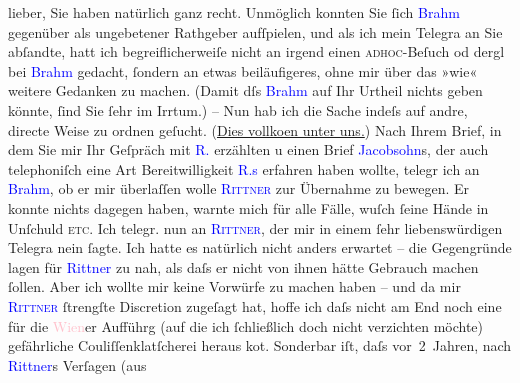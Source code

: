 \pstart
           lieber, Sie haben natürlich ganz recht. Unmöglich konnten Sie ſich
                  \textcolor{blue}{Brahm}{}\ledrightnote{\textcolor{blue}{Otto Brahm}} gegenüber als ungebetener Rathgeber
               aufſpielen, und als ich mein Telegra{\geminationm} an Sie abſandte,
               hatt ich begreiflicherweiſe nicht an irgend einen \textsc{adhoc}-Beſuch od dergl bei \textcolor{blue}{Brahm}{}\ledrightnote{\textcolor{blue}{Otto Brahm}} gedacht,
               ſondern an etwas beiläufigeres, ohne mir über das »wie« weitere Gedanken zu machen.
               (Damit dſs \textcolor{blue}{Brahm}{}\ledrightnote{\textcolor{blue}{Otto Brahm}} auf Ihr Urtheil nichts geben
               könnte, ſind Sie ſehr im Irrtum.) – Nun hab ich die Sache indeſs auf andre, directe
               Weise zu ordnen geſucht. {\pb}(\uline{Dies vollko{\geminationm}en unter
               uns.}) Nach Ihrem Brief, in dem Sie mir Ihr Geſpräch mit \textcolor{blue}{R.}{}\ledrightnote{\textcolor{blue}{Rudolf Rittner}} erzählten u einen Brief \textcolor{blue}{Jacobsohn}{}\ledrightnote{\textcolor{blue}{Siegfried Jacobsohn}}s, der auch telephoniſch eine Art Bereitwilligkeit \textcolor{blue}{R.s}{}\ledrightnote{\textcolor{blue}{Rudolf Rittner}} erfahren haben wollte, telegr ich an \textcolor{blue}{Brahm}{}\ledrightnote{\textcolor{blue}{Otto Brahm}}, ob er mir überlaſſen wolle \textcolor{blue}{\textsc{Rittner}}{}\ledrightnote{\textcolor{blue}{Rudolf Rittner}} zur Übernahme
               zu bewegen. Er konnte nichts dagegen haben, warnte mich für alle Fälle, wuſch ſeine
               Hände in Unſchuld \textsc{etc.} Ich telegr. nun an \textcolor{blue}{\textsc{Rittner}}{}\ledrightnote{\textcolor{blue}{Rudolf Rittner}}, der mir in einem ſehr
               liebenswürdigen Telegra{\geminationm} nein ſagte. Ich hatte es
               natürlich nicht anders erwartet – die Gegengründe lagen für \textcolor{blue}{Rittner}{}\ledrightnote{\textcolor{blue}{Rudolf Rittner}} zu nah, als daſs er nicht von ihnen hätte {\pb}Gebrauch machen ſollen. Aber ich wollte mir
               keine Vorwürfe zu machen haben – und da mir \textcolor{blue}{\textsc{Rittner}}{}\ledrightnote{\textcolor{blue}{Rudolf Rittner}} ſtrengſte Discretion zugeſagt hat, hoffe ich
               daſs nicht am End noch eine für die \textcolor{pink}{Wien}{}\ledrightnote{\textcolor{pink}{Wien}}er
               Aufführg (auf die ich ſchließlich doch nicht verzichten möchte) gefährliche
               Couliſſenklatſcherei heraus ko{\geminationm}t. Sonderbar iſt, daſs
               vor 2 Jahren, nach \textcolor{blue}{Rittner}{}\ledrightnote{\textcolor{blue}{Rudolf Rittner}}s Verſagen (aus
